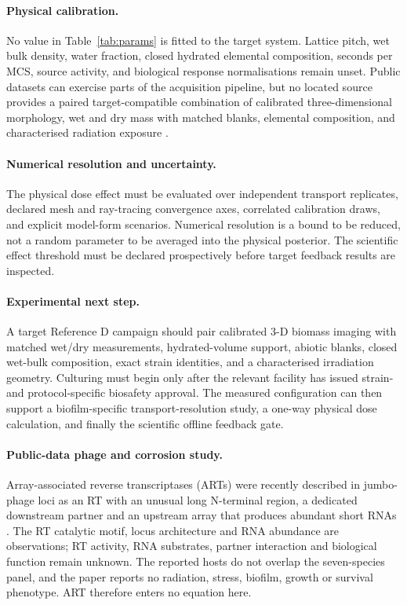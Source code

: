 \documentclass[11pt]{article}
\begin{document}
\paragraph{Physical calibration.}
No value in Table~\ref{tab:params} is fitted to the target system. Lattice pitch, wet bulk density,
water fraction, closed hydrated elemental composition, seconds per MCS, source activity, and
biological response normalisations remain unset. Public datasets can exercise parts of the
acquisition pipeline, but no located source provides a paired target-compatible combination of
calibrated three-dimensional morphology, wet and dry mass with matched blanks, elemental
composition, and characterised radiation exposure \cite{audit2026}.

\paragraph{Numerical resolution and uncertainty.}
The physical dose effect must be evaluated over independent transport replicates, declared mesh and
ray-tracing convergence axes, correlated calibration draws, and explicit model-form scenarios.
Numerical resolution is a bound to be reduced, not a random parameter to be averaged into the
physical posterior. The scientific effect threshold must be declared prospectively before target
feedback results are inspected.

\paragraph{Experimental next step.}
A target Reference D campaign should pair calibrated 3-D biomass imaging with matched wet/dry
measurements, hydrated-volume support, abiotic blanks, closed wet-bulk composition, exact strain
identities, and a characterised irradiation geometry. Culturing must begin only after the relevant
facility has issued strain- and protocol-specific biosafety approval. The measured configuration can
then support a biofilm-specific transport-resolution study, a one-way physical dose calculation,
and finally the scientific offline feedback gate.

\paragraph{Public-data phage and corrosion study.}
Array-associated reverse transcriptases (ARTs) were recently described in jumbo-phage loci as an
RT with an unusual long N-terminal region, a dedicated downstream partner and an upstream array
that produces abundant short RNAs \cite{yoon2026art}. The RT catalytic motif, locus architecture
and RNA abundance are observations; RT activity, RNA substrates, partner interaction and biological
function remain unknown. The reported hosts do not overlap the seven-species panel, and the paper
reports no radiation, stress, biofilm, growth or survival phenotype. ART therefore enters no
equation here.
\end{document}
